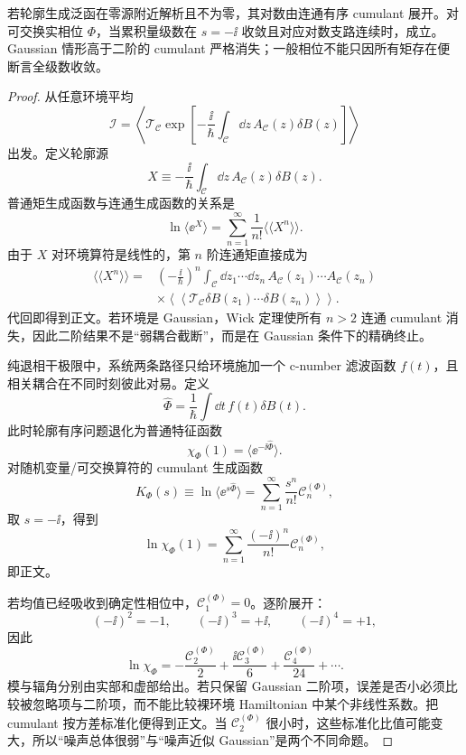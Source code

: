 \begin{proposition}[相位特征函数的累积量展开]
若轮廓生成泛函在零源附近解析且不为零，其对数由连通有序 cumulant 展开。对可交换实相位 $\Phi$，当累积量级数在 $s=-\ii$ 收敛且对应对数支路连续时，成立。Gaussian 情形高于二阶的 cumulant 严格消失；一般相位不能只因所有矩存在便断言全级数收敛。
\end{proposition}
\begin{proof}
从任意环境平均
\[
\mathscr I
=\left\langle
\mathcal T_{\mathcal C}
\exp\!\left[-\frac{\ii}{\hbar}
\int_{\mathcal C}\dd z\,
A_{\mathcal C}(z)\delta B(z)
\right]
\right\rangle
\]
出发。定义轮廓源
\[
X\equiv-\frac{\ii}{\hbar}
\int_{\mathcal C}\dd z\,
A_{\mathcal C}(z)\delta B(z).
\]
普通矩生成函数与连通生成函数的关系是
\[
\ln\langle\ee^X\rangle
=\sum_{n=1}^{\infty}\frac1{n!}
\langle\!\langle X^n\rangle\!\rangle.
\]
由于 $X$ 对环境算符是线性的，第 $n$ 阶连通矩直接成为
\begin{align*}
\langle\!\langle X^n\rangle\!\rangle
={}&\left(-\frac{\ii}{\hbar}\right)^n
\int_{\mathcal C}\dd z_1\cdots\dd z_n\,
A_{\mathcal C}(z_1)\cdots A_{\mathcal C}(z_n)\\
&\times
\left\langle\!\left\langle
\mathcal T_{\mathcal C}
\delta B(z_1)\cdots\delta B(z_n)
\right\rangle\!\right\rangle.
\end{align*}
代回即得到正文。若环境是 Gaussian，Wick 定理使所有 $n>2$ 连通 cumulant 消失，因此二阶结果不是“弱耦合截断”，而是在 Gaussian 条件下的精确终止。

纯退相干极限中，系统两条路径只给环境施加一个 c-number 滤波函数 $f(t)$，且相关耦合在不同时刻彼此对易。定义
\[
\hat\Phi=\frac1\hbar\int\dd t\,f(t)\delta B(t).
\]
此时轮廓有序问题退化为普通特征函数
\[
\chi_\Phi(1)=\langle\ee^{-\ii\hat\Phi}\rangle.
\]
对随机变量/可交换算符的 cumulant 生成函数
\[
K_\Phi(s)
\equiv\ln\langle\ee^{s\hat\Phi}\rangle
=\sum_{n=1}^{\infty}\frac{s^n}{n!}\mathcal C_n^{(\Phi)},
\]
取 $s=-\ii$，得到
\[
\ln\chi_\Phi(1)
=\sum_{n=1}^{\infty}\frac{(-\ii)^n}{n!}\mathcal C_n^{(\Phi)},
\]
即正文。

若均值已经吸收到确定性相位中，$\mathcal C_1^{(\Phi)}=0$。逐阶展开：
\[
(-\ii)^2=-1,
\qquad
(-\ii)^3=+\ii,
\qquad
(-\ii)^4=+1,
\]
因此
\[
\ln\chi_\Phi
=-\frac{\mathcal C_2^{(\Phi)}}{2}
+\frac{\ii\mathcal C_3^{(\Phi)}}{6}
+\frac{\mathcal C_4^{(\Phi)}}{24}+\cdots.
\]
模与辐角分别由实部和虚部给出。若只保留 Gaussian 二阶项，误差是否小必须比较被忽略项与二阶项，而不能比较裸环境 Hamiltonian 中某个非线性系数。把 cumulant 按方差标准化便得到正文。当 $\mathcal C_2^{(\Phi)}$ 很小时，这些标准化比值可能变大，所以“噪声总体很弱”与“噪声近似 Gaussian”是两个不同命题。
\end{proof}


